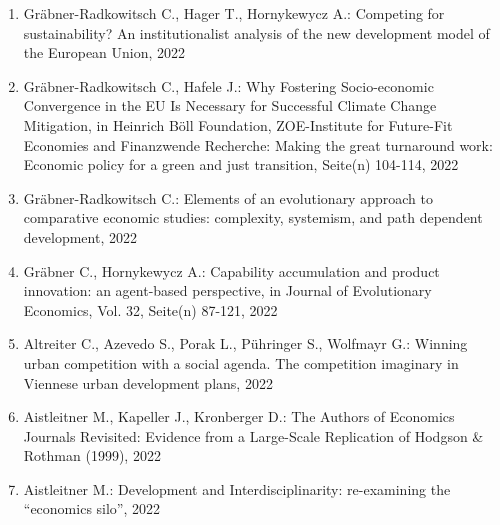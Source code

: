 \begin{enumerate}
	 \item Gräbner-Radkowitsch C., Hager T., Hornykewycz A.: Competing for sustainability? An institutionalist analysis of the new development model of the European Union, 2022
	 \item Gräbner-Radkowitsch C., Hafele J.: Why Fostering Socio-economic Convergence in the EU Is Necessary for Successful Climate Change Mitigation, in Heinrich Böll Foundation, ZOE-Institute for Future-Fit Economies and Finanzwende Recherche: Making the great turnaround work: Economic policy for a green and just transition, Seite(n) 104-114, 2022
	 \item Gräbner-Radkowitsch C.: Elements of an evolutionary approach to comparative economic studies: complexity, systemism, and path dependent development, 2022
	 \item Gräbner C., Hornykewycz A.: Capability accumulation and product innovation: an agent-based perspective, in Journal of Evolutionary Economics, Vol. 32, Seite(n) 87-121, 2022
	 \item Altreiter C., Azevedo S., Porak L., Pühringer S., Wolfmayr G.: Winning urban competition with a social agenda. The competition imaginary in Viennese urban development plans, 2022
	 \item Aistleitner M., Kapeller J., Kronberger D.: The Authors of Economics Journals Revisited: Evidence from a Large-Scale Replication of Hodgson \& Rothman (1999), 2022
	 \item Aistleitner M.: Development and Interdisciplinarity: re-examining the “economics silo”, 2022
\end{enumerate}
